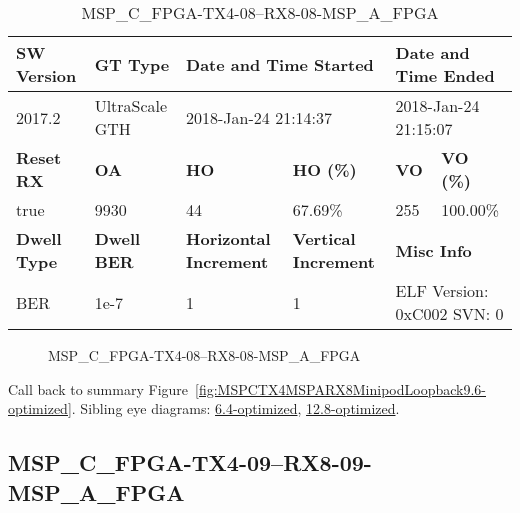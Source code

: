 \begin{table}[h]
\centering
\caption{MSP\_C\_FPGA-TX4-08--RX8-08-MSP\_A\_FPGA}
\label{tab:MSPCFPGATX408RX808MSPAFPGA9.6-optimized}
\begin{tabular}{@{}|l|l|l|l|l|l|@{}}
\toprule
\textbf{SW Version}                & \textbf{GT Type}   & \multicolumn{2}{l|}{\textbf{Date and Time Started}}            & \multicolumn{2}{l|}{\textbf{Date and Time Ended}}        \\ \midrule
2017.2                       & UltraScale GTH          & \multicolumn{2}{l|}{2018-Jan-24 21:14:37}                   & \multicolumn{2}{l|}{2018-Jan-24 21:15:07}               \\ \midrule
\textbf{Reset RX}                  & \textbf{OA} & \textbf{HO}   & \textbf{HO (\%)} & \textbf{VO} & \textbf{VO (\%)} \\ \midrule
true & 9930        & 44          & 67.69\%        & 255        & 100.00\%       \\ \midrule
\textbf{Dwell Type}                & \textbf{Dwell BER} & \textbf{Horizontal Increment} & \textbf{Vertical Increment}    & \multicolumn{2}{l|}{\textbf{Misc Info}}                  \\ \midrule
BER                            & 1e-7        & 1        & 1           & \multicolumn{2}{l|}{ELF Version: 0xC002 SVN: 0}                         \\ \bottomrule
\end{tabular}
\end{table}

\begin{figure}[h]
\caption{MSP\_C\_FPGA-TX4-08--RX8-08-MSP\_A\_FPGA} \label{fig:MSPCFPGATX408RX808MSPAFPGA9.6-optimized}
\end{figure}

Call back to summary Figure~\ref{fig:MSPCTX4MSPARX8MinipodLoopback9.6-optimized}.
Sibling eye diagrams: \hyperref[sec:MSPCFPGATX408RX808MSPAFPGA6.4-optimized]{6.4-optimized}, \hyperref[sec:MSPCFPGATX408RX808MSPAFPGA12.8-optimized]{12.8-optimized}.

\clearpage
\newpage


\subsection{MSP\_C\_FPGA-TX4-09--RX8-09-MSP\_A\_FPGA}\label{sec:MSPCFPGATX409RX809MSPAFPGA9.6-optimized}


